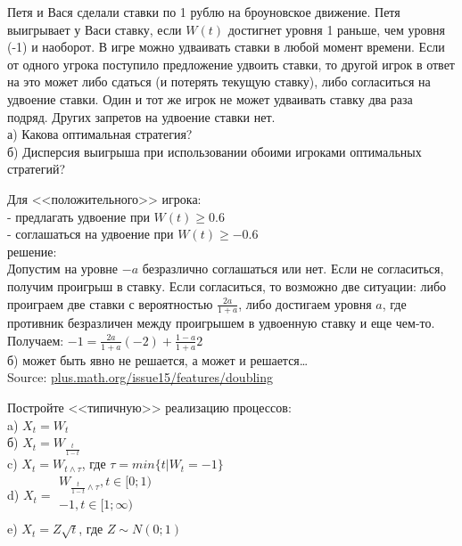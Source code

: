 \begin{solution}
\begin{solution}
\begin{solution}
\begin{solution}
\begin{solution}
\begin{solution}
\begin{solution}
\begin{solution}
\begin{solution}
\begin{solution}
{\begin{problem}
Петя и Вася сделали ставки по 1 рублю на броуновское движение. Петя выигрывает у Васи ставку, если $W(t)$ достигнет уровня 1 раньше, чем уровня (-1) и наоборот. В игре можно удваивать ставки в любой момент времени. Если от одного угрока поступило предложение удвоить ставки, то другой игрок в ответ на это может либо сдаться (и потерять текущую ставку), либо согласиться на удвоение ставки. Один и тот же игрок не может удваивать ставку два раза подряд. Других запретов на удвоение ставки нет. \\
а) Какова оптимальная стратегия?\\
б) Дисперсия выигрыша при использовании обоими игроками оптимальных стратегий? \\

\end{problem} 
\begin{solution} 
Для <<положительного>> игрока: \\
- предлагать удвоение при $W(t)\geq 0.6$ \\
- соглашаться на удвоение при $W(t)\geq -0.6$ \\
решение: \\
Допустим на уровне $-a$ безразлично соглашаться или нет. Если не согласиться, получим проигрыш в ставку. Если согласиться, то возможно две ситуации: либо проиграем две ставки с вероятностью $\frac{2a}{1+a}$, либо достигаем уровня $a$, где противник безразличен между проигрышем в удвоенную ставку и еще чем-то. \\
Получаем: $-1=\frac{2a}{1+a}(-2)+\frac{1-a}{1+a}2$ \\
б) может быть явно не решается, а может и решается\ldots\\
Source: \url{plus.math.org/issue15/features/doubling}
\end{solution}

\begin{problem}
Постройте <<типичную>> реализацию процессов: \\
a) $X_{t}=W_{t}$ \\
б) $X_{t}=W_{\frac{t}{1-t}}$ \\
c) $X_{t}=W_{t\wedge \tau}$, где $\tau=min\{t|W_{t}=-1\}$ \\
d) $X_{t}=\begin{array}{l}
W_{\frac{t}{1-t}\wedge\tau}, t\in [0;1) \\
-1, t\in[1;\infty) \\
\end{array}$ \\
e) $X_{t}=Z\sqrt{t}$, где $Z\sim N(0;1)$ 
\end{problem} 
\begin{solution} 


\end{solution}}
\end{solution}
\end{solution}
\end{solution}
\end{solution}
\end{solution}
\end{solution}
\end{solution}
\end{solution}
\end{solution}
\end{solution}
